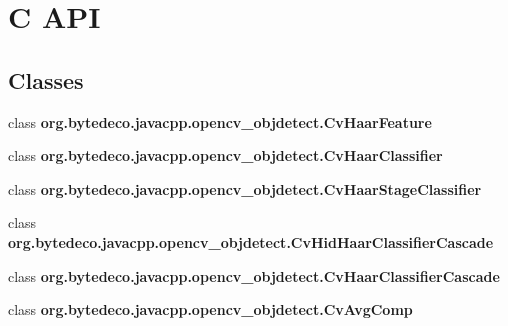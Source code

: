 \hypertarget{group__objdetect__c}{}\section{C A\+PI}
\label{group__objdetect__c}
\subsection*{Classes}
\begin{DoxyCompactItemize}
\item 
class {\bfseries org.\+bytedeco.\+javacpp.\+opencv\+\_\+objdetect.\+Cv\+Haar\+Feature}
\item 
class {\bfseries org.\+bytedeco.\+javacpp.\+opencv\+\_\+objdetect.\+Cv\+Haar\+Classifier}
\item 
class {\bfseries org.\+bytedeco.\+javacpp.\+opencv\+\_\+objdetect.\+Cv\+Haar\+Stage\+Classifier}
\item 
class {\bfseries org.\+bytedeco.\+javacpp.\+opencv\+\_\+objdetect.\+Cv\+Hid\+Haar\+Classifier\+Cascade}
\item 
class {\bfseries org.\+bytedeco.\+javacpp.\+opencv\+\_\+objdetect.\+Cv\+Haar\+Classifier\+Cascade}
\item 
class {\bfseries org.\+bytedeco.\+javacpp.\+opencv\+\_\+objdetect.\+Cv\+Avg\+Comp}
\end{DoxyCompactItemize}
